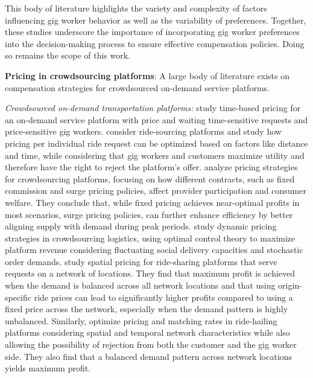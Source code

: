 This body of literature highlights the variety and complexity of factors influencing gig worker behavior as well as the variability of preferences. Together, these studies underscore the importance of incorporating gig worker preferences into the decision-making process to ensure effective compensation policies. Doing so remains the scope of this work.

\noindent \textbf{Pricing in crowdsourcing platforms}: A large body of literature exists on compensation strategies for crowdsourced on-demand service platforms.

\noindent \textit{Crowdsourced on-demand transportation platforms:} \cite{bai2019coordinating} study time-based pricing for an on-demand service platform with price and waiting time-sensitive requests and price-sensitive gig workers. \cite{sun2019optimal} consider ride-sourcing platforms and study how pricing per individual ride request can be optimized based on factors like distance and time, while considering that gig workers and customers maximize utility and therefore have the right to reject the platform's offer. \cite{cachon2017role} analyze pricing strategies for crowdsourcing platforms, focusing on how different contracts, such as fixed commission and surge pricing policies, affect provider participation and consumer welfare. They conclude that, while fixed pricing achieves near-optimal profits in most scenarios, surge pricing policies, can further enhance efficiency by better aligning supply with demand during peak periods. \cite{wang2022optimal} study dynamic pricing strategies in crowdsourcing logistics, using optimal control theory to maximize platform revenue considering fluctuating social delivery capacities and stochastic order demands. \cite{bimpikis2019spatial} study spatial pricing for ride-sharing platforms that serve requests on a network of locations. They find that maximum profit is achieved when the demand is balanced across all network locations and that using origin-specific ride prices can lead to significantly higher profits compared to using a fixed price across the network, especially when the demand pattern is highly unbalanced. Similarly, \cite{meskar2023spatio} optimize pricing and matching rates in ride-hailing platforms considering spatial and temporal network characteristics while also allowing the possibility of rejection from both the customer and the gig worker side. They also find that a balanced demand pattern across network locations yields maximum profit.

